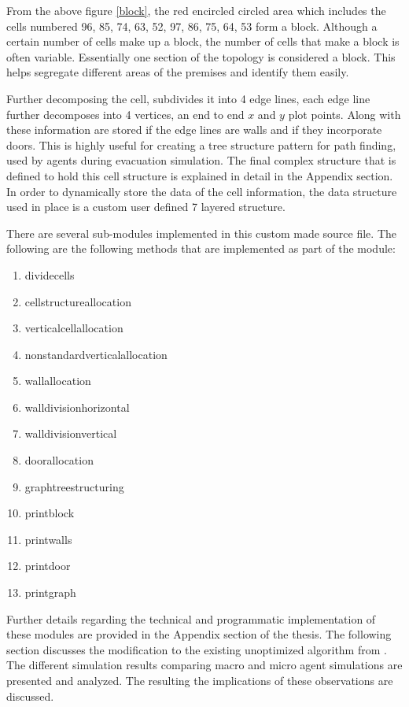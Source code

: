 From the above figure \ref{block}, the red encircled circled area which includes the cells numbered 96, 85, 74, 63, 52, 97, 86, 75, 64, 53 form a block. Although a certain number of cells make up a block, the number of cells that make a block is often variable. Essentially one section of the topology is considered a block. This helps segregate different areas of the premises and identify them easily.

Further decomposing the cell, subdivides it into 4 edge lines, each edge line further decomposes into 4 vertices, an end to end $x$ and $y$ plot points. Along with these information are stored if the edge lines are walls and if they incorporate doors. This is highly useful for creating a tree structure pattern for path finding, used by agents during evacuation simulation. The final complex structure that is defined to hold this cell structure is explained in detail in the Appendix section. In order to dynamically store the data of the cell information, the data structure used in place is a custom user defined 7 layered structure. 

There are several sub-modules implemented in this custom made source file. The following are the following methods that are implemented as part of the module:

\begin{enumerate}
  \item divide\textunderscore cells
  \item cell\textunderscore structure\textunderscore allocation
  \item vertical\textunderscore cell\textunderscore allocation
  \item non\textunderscore standard\textunderscore vertical\textunderscore allocation
  \item wall\textunderscore allocation
  \item wall\textunderscore division\textunderscore horizontal
  \item wall\textunderscore division\textunderscore vertical
  \item door\textunderscore allocation
  \item graph\textunderscore tree\textunderscore structuring
  \item print\textunderscore block
  \item print\textunderscore walls
  \item print\textunderscore door
  \item print\textunderscore graph
\end{enumerate}

Further details regarding the technical and programmatic implementation of these modules are provided in the Appendix section of the thesis. The following section discusses the modification to the existing unoptimized algorithm from \cite{ref5}. The different simulation results comparing macro and micro agent simulations are presented and analyzed. The resulting the implications of these observations are discussed. 
